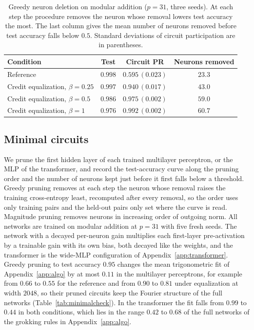 \documentclass{article} %
\begin{document}
\begin{table}[!ht]
\caption{Greedy neuron deletion on modular addition ($p=31$, three seeds). At each step the procedure removes the neuron whose removal lowers test accuracy the most. The last column gives the mean number of neurons removed before test accuracy falls below $0.5$. Standard deviations of circuit participation are in parentheses.}
\label{tab:plane}
\begin{center}
\small
\begin{tabular}{lccc}
\toprule
Condition & Test & Circuit PR & Neurons removed \\
\midrule
Reference & $0.998$ & $0.595\,(0.023)$ & $23.3$ \\
Credit equalization, $\beta{=}0.25$ & $0.997$ & $0.940\,(0.017)$ & $43.0$ \\
Credit equalization, $\beta{=}0.5$ & $0.986$ & $0.975\,(0.002)$ & $59.0$ \\
Credit equalization, $\beta{=}1$ & $0.976$ & $0.992\,(0.002)$ & $60.7$ \\
\bottomrule
\end{tabular}
\end{center}
\end{table}

\subsection{Minimal circuits}
\label{app:minimal}
We prune the first hidden layer of each trained multilayer perceptron, or the MLP of the transformer, and record the test-accuracy curve along the pruning order and the number of neurons kept just before it first falls below a threshold. Greedy pruning removes at each step the neuron whose removal raises the training cross-entropy least, recomputed after every removal, so the order uses only training pairs and the held-out pairs only set where the curve is read. Magnitude pruning removes neurons in increasing order of outgoing norm. All networks are trained on modular addition at $p = 31$ with five fresh seeds. The network with a decayed per-neuron gain multiplies each first-layer pre-activation by a trainable gain with its own bias, both decayed like the weights, and the transformer is the wide-MLP configuration of Appendix~\ref{app:transformer}. Greedy pruning to test accuracy $0.95$ changes the mean trigonometric fit of Appendix~\ref{app:algo} by at most $0.11$ in the multilayer perceptrons, for example from $0.66$ to $0.55$ for the reference and from $0.90$ to $0.81$ under equalization at width $2048$, so their pruned circuits keep the Fourier structure of the full networks (Table~\ref{tab:minimalcheck}). In the transformer the fit falls from $0.99$ to $0.44$ in both conditions, which lies in the range $0.42$ to $0.68$ of the full networks of the grokking rules in Appendix~\ref{app:algo}.
\end{document}
